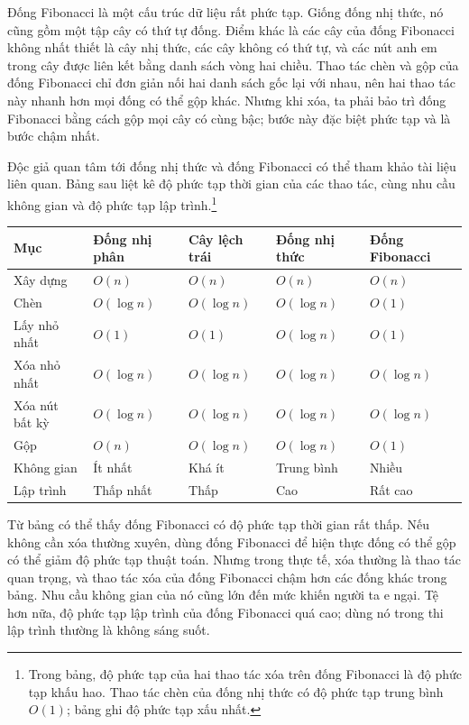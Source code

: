 \documentclass[11pt]{article}
\begin{document}
Đống Fibonacci là một cấu trúc dữ liệu rất phức tạp. Giống đống nhị thức, nó
cũng gồm một tập cây có thứ tự đống. Điểm khác là các cây của đống Fibonacci
không nhất thiết là cây nhị thức, các cây không có thứ tự, và các nút anh em
trong cây được liên kết bằng danh sách vòng hai chiều. Thao tác chèn và gộp của
đống Fibonacci chỉ đơn giản nối hai danh sách gốc lại với nhau, nên hai thao tác
này nhanh hơn mọi đống có thể gộp khác. Nhưng khi xóa, ta phải bảo trì đống
Fibonacci bằng cách gộp mọi cây có cùng bậc; bước này đặc biệt phức tạp và là
bước chậm nhất.

Độc giả quan tâm tới đống nhị thức và đống Fibonacci có thể tham khảo tài liệu
liên quan. Bảng sau liệt kê độ phức tạp thời gian của các thao tác, cùng nhu
cầu không gian và độ phức tạp lập trình.\footnote{Trong bảng, độ phức tạp của
hai thao tác xóa trên đống Fibonacci là độ phức tạp khấu hao. Thao tác chèn của
đống nhị thức có độ phức tạp trung bình \(O(1)\); bảng ghi độ phức tạp xấu
nhất.}

\begin{center}
\begin{tabular}{lllll}
\hline
Mục & Đống nhị phân & Cây lệch trái & Đống nhị thức & Đống Fibonacci\\
\hline
Xây dựng & \(O(n)\) & \(O(n)\) & \(O(n)\) & \(O(n)\)\\
Chèn & \(O(\log n)\) & \(O(\log n)\) & \(O(\log n)\) & \(O(1)\)\\
Lấy nhỏ nhất & \(O(1)\) & \(O(1)\) & \(O(\log n)\) & \(O(1)\)\\
Xóa nhỏ nhất & \(O(\log n)\) & \(O(\log n)\) & \(O(\log n)\) & \(O(\log n)\)\\
Xóa nút bất kỳ & \(O(\log n)\) & \(O(\log n)\) & \(O(\log n)\) & \(O(\log n)\)\\
Gộp & \(O(n)\) & \(O(\log n)\) & \(O(\log n)\) & \(O(1)\)\\
Không gian & Ít nhất & Khá ít & Trung bình & Nhiều\\
Lập trình & Thấp nhất & Thấp & Cao & Rất cao\\
\hline
\end{tabular}
\end{center}

Từ bảng có thể thấy đống Fibonacci có độ phức tạp thời gian rất thấp. Nếu không
cần xóa thường xuyên, dùng đống Fibonacci để hiện thực đống có thể gộp có thể
giảm độ phức tạp thuật toán. Nhưng trong thực tế, xóa thường là thao tác quan
trọng, và thao tác xóa của đống Fibonacci chậm hơn các đống khác trong bảng.
Nhu cầu không gian của nó cũng lớn đến mức khiến người ta e ngại. Tệ hơn nữa,
độ phức tạp lập trình của đống Fibonacci quá cao; dùng nó trong thi lập trình
thường là không sáng suốt.
\end{document}
